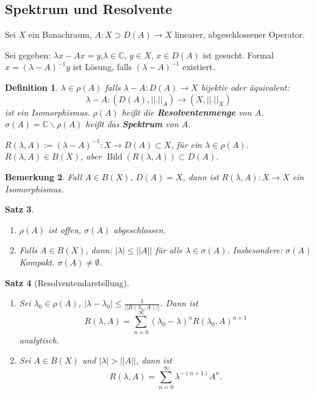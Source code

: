 \documentclass[11pt,a4paper,titlepage, ngerman]{scrartcl}
\newtheorem{Satz}{Satz}[section]
\newtheorem{Definition}[Satz]{Definition}
\newtheorem{Bemerkung}[Satz]{Bemerkung}
\DeclareMathOperator{\Bild}{Bild}
\numberwithin{equation}{section}
\newcommand{\C}{\mathbb{C}} %
\begin{document}
	\subsection{Spektrum und Resolvente}
	
	Sei $X$ ein Banachraum, $A:X\supset D(A)\rightarrow X$ linearer, abgeschlossener Operator.
	
	Sei gegeben: $\lambda x-Ax=y$,$\lambda\in \C$, $y\in X$, $x\in D(A)$ ist gesucht. Formal $x=(\lambda-A)^{-1}y$ ist Lösung, falls $(\lambda-A)^{-1}$ existiert.
	
	\begin{Definition}
		$\lambda\in \rho(A)$ falls $\lambda -A: D(A)\rightarrow X$ bijektiv oder äquivalent: 
		$$\lambda-A:(D(A),||.||_A)\rightarrow (X,||.||_X)$$
		ist ein Isomorphismus. $\rho(A)$ heißt die \textbf{Resolventenmenge} von $A$. $\sigma(A)=\C\backslash\rho(A)$ heißt das \textbf{Spektrum} von $A$.
		
		$R(\lambda, A):= (\lambda-A)^{-1}: X\rightarrow D(A)\subset X$, für ein $\lambda\in \rho(A)$. $R(\lambda,A)\in B(X)$, aber $\Bild(R(\lambda,A))\subset D(A)$.
	\end{Definition}
	
	\begin{Bemerkung}
		Fall $A\in B(X)$, $D(A) = X$, dann ist $R(\lambda, A): X\rightarrow X$ ein 
		Isomorphismus.
	\end{Bemerkung}
	
	\begin{Satz}~
		\begin{enumerate}
			\item[a)] $\rho(A)$ ist offen, $\sigma(A)$ abgeschlossen.
			\item[b)] Falls $A\in B(X)$, dann: $|\lambda|\leq ||A||$ für alle $\lambda\in \sigma(A)$. Insbesondere: $\sigma(A)$ Kompakt. $\sigma(A)\neq\emptyset$.
		\end{enumerate}
	\end{Satz}
	
	\begin{Satz}[Resolventendarstellung]~
		\begin{enumerate}
			\item[a)] Sei $\lambda_0\in \rho(A)$, $|\lambda-\lambda_0|\leq\frac{1}{||R(\lambda_0,A)||}$. Dann ist
			$$R(\lambda,A) =\sum_{n = 0}^{\infty} (\lambda_0-\lambda)^n R(\lambda_0, A)^{n+1}$$
			analytisch.
			\item[b)] Sei $A\in B(X)$ und $|\lambda|>||A||$, dann ist 
			$$R(\lambda, A) = \sum_{n = 0}^{\infty}\lambda^{-(n+1)}A^n.$$ 
		\end{enumerate}
	\end{Satz}
	
\end{document}
